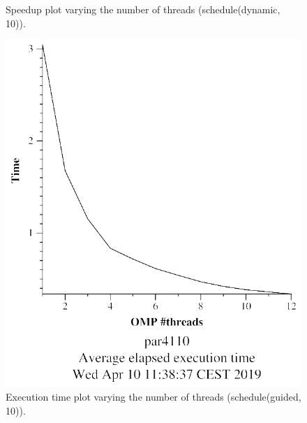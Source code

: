 \documentclass[12pt, a4paper]{article}
\begin{document}
\begin{figure}[H]
\begin{minipage}[b]{0.4\linewidth}
  \caption{Speedup plot varying the number of threads (schedule(dynamic, 10)).}
  \label{fig:mandel-omp-10000-strong-omp-for-dynamic-800-speedup}
\end{minipage}
\end{figure}

\begin{figure}[H]
\centering
\begin{minipage}[b]{0.4\linewidth}
  \centering
  \includegraphics[scale=0.5]{./mandel-omp-10000-strong-omp-for-guided-800-time}
  \caption{Execution time plot varying the number of threads (schedule(guided, 10)).}
  \label{fig:mandel-omp-10000-strong-omp-for-guided-800-time}
\end{minipage}%
\hspace{0.5cm}
\begin{minipage}[b]{0.4\linewidth}
  \centering

\end{minipage}
\end{figure}
\end{document}
